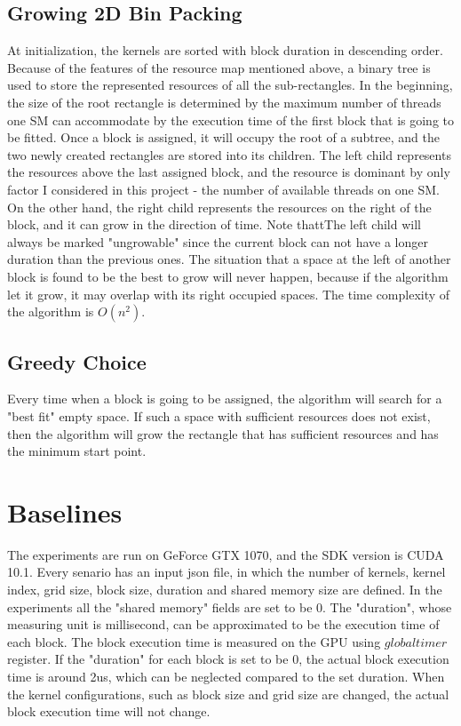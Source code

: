 \documentclass[conference]{IEEEtran}
\begin{document}
\subsection{Growing 2D Bin Packing}
At initialization, the kernels are sorted with block duration in descending order. Because of the features of the resource map mentioned above, a binary tree is used to store the represented resources of all the sub-rectangles. In the beginning, the size of the root rectangle is determined by the maximum number of threads one SM can accommodate by the execution time of the first block that is going to be fitted. Once a block is assigned, it will occupy the root of a subtree, and the two newly created rectangles are stored into its children. The left child represents the resources above the last assigned block, and the resource is dominant by only factor I considered in this project - the number of available threads on one SM. On the other hand, the right child represents the resources on the right of the block, and it can grow in the direction of time. Note thattThe left child will always be marked "ungrowable" since the current block can not have a longer duration than the previous ones. The situation that a space at the left of another block is found to be the best to grow will never happen, because if the algorithm let it grow, it may overlap with its right occupied spaces. The time complexity of the algorithm is $O(n^2)$.
\subsection{Greedy Choice}
Every time when a block is going to be assigned, the algorithm will search for a "best fit" empty space. If such a space with sufficient resources does not exist, then the algorithm will grow the rectangle that has sufficient resources and has the minimum start point.


\section{Baselines}
The experiments are run on GeForce GTX 1070, and the SDK version is CUDA 10.1. Every senario has an input json file, in which the number of kernels, kernel index, grid size, block size, duration and shared memory size are defined. In the experiments all the "shared memory" fields are set to be 0. The "duration", whose measuring unit is millisecond, can be approximated to be the execution time of each block. The block execution time is measured on the GPU using $globaltimer$ register. If the "duration" for each block is set to be 0, the actual block execution time is around 2us, which can be neglected compared to the set duration. When the kernel configurations, such as block size and grid size are changed, the actual block execution time will not change.
\end{document}
